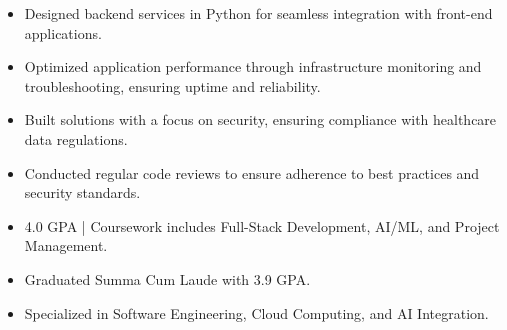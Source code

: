 \par\smallskip
\noindent
\begin{minipage}{20cm}
  \begin{minipage}{9.75cm}
    \begin{itemize}
      \item Designed backend services in Python for seamless integration with front-end applications.
      \item Optimized application performance through infrastructure monitoring and troubleshooting, ensuring uptime and reliability.
    \end{itemize}
  \end{minipage}
  \hfill
  \begin{minipage}{9.75cm}
    \begin{itemize}
      \item Built solutions with a focus on security, ensuring compliance with healthcare data regulations.
      \item Conducted regular code reviews to ensure adherence to best practices and security standards.
    \end{itemize}
  \end{minipage}
\end{minipage}
\par\smallskip
\divider

\begin{itemize}
  \item 4.0 GPA | Coursework includes Full-Stack Development, AI/ML, and Project Management.
\end{itemize}
\divider

\begin{itemize}
  \item Graduated Summa Cum Laude with 3.9 GPA.
  \item Specialized in Software Engineering, Cloud Computing, and AI Integration.
\end{itemize}

\noindent
\begin{minipage}{20cm}
\end{minipage}


